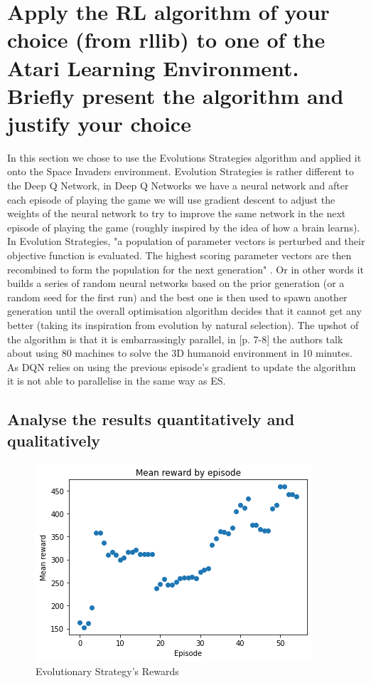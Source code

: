 \documentclass[a4pape, 11pt, english]{article}
\begin{document}
\section{Apply the RL algorithm of your choice (from rllib) to one of the Atari Learning Environment. Briefly present the algorithm and justify your choice}
In this section we chose to use the Evolutions Strategies algorithm and applied it onto the Space Invaders environment. Evolution Strategies is rather different to the Deep Q Network, in Deep Q Networks we have a neural network and after each episode of playing the game we will use gradient descent to adjust the weights of the neural network to try to improve the same network in the next episode of playing the game (roughly inspired by the idea of how a brain learns). In Evolution Strategies, "a population of parameter vectors is perturbed and their objective function is evaluated. The highest scoring parameter vectors are then recombined to form the population for the next generation" \citep{salimans_evolution_2017}. Or in other words it builds a series of random neural networks based on the prior generation (or a random seed for the first run) and the best one is then used to spawn another generation until the overall optimisation algorithm decides that it cannot get any better (taking its inspiration from evolution by natural selection).
The upshot of the algorithm is that it is embarrassingly parallel, in  \citep{salimans_evolution_2017}[p. 7-8] the authors talk about using 80 machines to solve the 3D humanoid environment in 10 minutes. As DQN relies on using the previous episode's gradient to update the algorithm it is not able to parallelise in the same way as ES.

\subsection{Analyse the results quantitatively and qualitatively}

\begin{figure}[h!]
	\begin{center}
		\includegraphics{img/SpaceInvaderRewards2.png}
		\caption{Evolutionary Strategy's Rewards}
		\label{fig:SpaceInvaderRewards}
	\end{center}
\end{figure}
\end{document}
